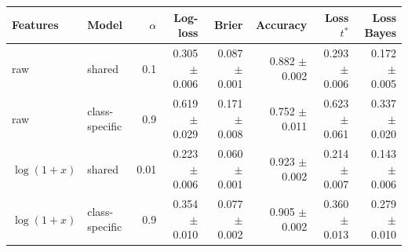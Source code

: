 \begin{tabular}{llrrrrrr}
\toprule
Features & Model & $\alpha$ & Log-loss & Brier & Accuracy & Loss $t^\ast$ & Loss Bayes \\
\midrule
raw & shared & 0.1 & 0.305 $\pm$ 0.006 & 0.087 $\pm$ 0.001 & 0.882 $\pm$ 0.002 & 0.293 $\pm$ 0.006 & 0.172 $\pm$ 0.005 \\
raw & class-specific & 0.9 & 0.619 $\pm$ 0.029 & 0.171 $\pm$ 0.008 & 0.752 $\pm$ 0.011 & 0.623 $\pm$ 0.061 & 0.337 $\pm$ 0.020 \\
$\log(1+x)$ & shared & 0.01 & 0.223 $\pm$ 0.006 & 0.060 $\pm$ 0.001 & 0.923 $\pm$ 0.002 & 0.214 $\pm$ 0.007 & 0.143 $\pm$ 0.006 \\
$\log(1+x)$ & class-specific & 0.9 & 0.354 $\pm$ 0.010 & 0.077 $\pm$ 0.002 & 0.905 $\pm$ 0.002 & 0.360 $\pm$ 0.013 & 0.279 $\pm$ 0.010 \\
\bottomrule
\end{tabular}
